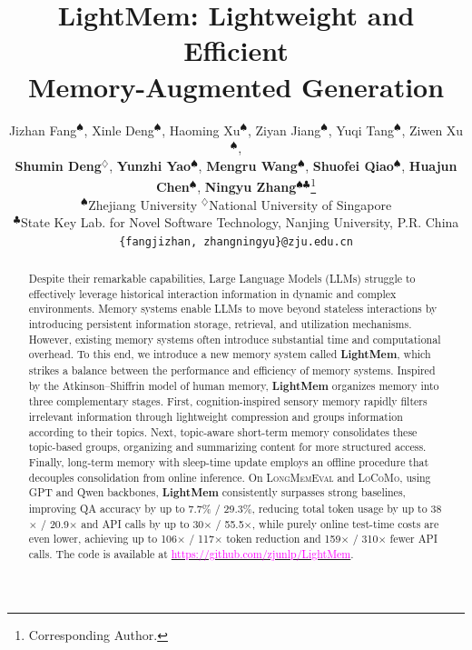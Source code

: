 \documentclass{article} %
\title{LightMem: Lightweight and Efficient\\ Memory-Augmented Generation}
\author{
Jizhan Fang$^{\spadesuit}$,
Xinle Deng$^{\spadesuit}$,
Haoming Xu$^{\spadesuit}$,
Ziyan Jiang$^{\spadesuit}$,
Yuqi Tang$^{\spadesuit}$,
Ziwen Xu$^{\spadesuit}$,
\\ 
\textbf{ Shumin Deng}$^{\diamondsuit}$,
\textbf{Yunzhi Yao}$^{\spadesuit}$,
\textbf{Mengru Wang}$^{\spadesuit}$,
\textbf{Shuofei Qiao}$^{\spadesuit}$,
\textbf{Huajun Chen}$^{\spadesuit}$,
\textbf{Ningyu Zhang}$^{\spadesuit\clubsuit}$\thanks{Corresponding Author.} \\
$^{\spadesuit}$Zhejiang University \quad
$^{\diamondsuit}$National University of Singapore \\
$^{\clubsuit}$State Key Lab. for Novel Software Technology, Nanjing University, P.R. China\\
\texttt{\{fangjizhan, zhangningyu\}@zju.edu.cn}
}
\newcommand{\change}[1]{#1}
\begin{document}
\maketitle

\begin{abstract}
Despite their remarkable capabilities, Large Language Models (LLMs) struggle to effectively leverage historical interaction information in dynamic and complex environments. Memory systems enable LLMs to move beyond stateless interactions by introducing persistent information storage, retrieval, and utilization mechanisms. However, existing memory systems often introduce substantial time and computational overhead. To this end, we introduce a new memory system called \textbf{LightMem}, which strikes a balance between the performance and efficiency of memory systems. Inspired by the Atkinson–Shiffrin model of human memory, \textbf{LightMem} organizes memory into three complementary stages. First, cognition-inspired sensory memory rapidly filters irrelevant information through lightweight compression and groups information according to their topics. Next, topic-aware short-term memory consolidates these topic-based groups, organizing and summarizing content for more structured access. Finally, long-term memory with sleep-time update employs an offline procedure that decouples consolidation from online inference. 
\change{On \textsc{LongMemEval} and \textsc{LoCoMo}, using GPT and Qwen backbones, \textbf{LightMem} consistently surpasses strong baselines, improving QA accuracy by up to 7.7\% / 29.3\%, reducing total token usage by up to 38$\times$ / 20.9$\times$ and API calls by up to 30$\times$ / 55.5$\times$, while purely online test-time costs are even lower, achieving up to 106$\times$ / 117$\times$ token reduction and 159$\times$ / 310$\times$ fewer API calls.
The code is available at \href{https://github.com/zjunlp/LightMem}{\textcolor{magenta}{https://github.com/zjunlp/LightMem}}.}

\end{abstract}
\end{document}
